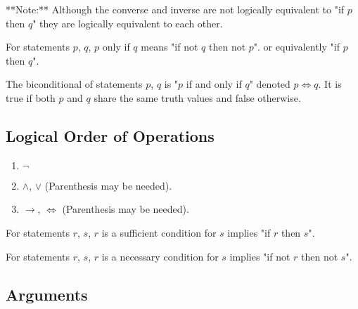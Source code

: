 \documentclass[11pt]{article}
\begin{document}
\starON
**Note:** Although the converse and inverse are not logically equivalent to "if $p$ then $q$"
they are logically equivalent to each other.
\starOFF

\begin{definition}[Only If]\label{def:only-if}
    For statements $p$, $q$,
    $p$ only if $q$ means "if not $q$ then not $p$".
    or equivalently "if $p$ then $q$".
\end{definition}

\begin{definition}[Biconditional]\label{def:biconditional}
    The biconditional of statements $p$, $q$ is
    "$p$ if and only if $q$" denoted $p \iff q$. It
    is true if both $p$ and $q$ share the same truth values
    and false otherwise.
\end{definition}

\subsection{Logical Order of Operations}
\begin{enumerate}
    \item $\neg$
    \item $\land$, $\lor$ (Parenthesis may be needed).
    \item $\to$, $\iff$ (Parenthesis may be needed).
\end{enumerate}

\begin{definition}\label{def:sufficient-condition}
    For statements $r$, $s$,
    $r$ is a sufficient condition for $s$ implies "if $r$ then $s$".
\end{definition}

\begin{definition}\label{def:necessary-condition}
    For statements $r$, $s$,
    $r$ is a necessary condition for $s$ implies "if not $r$ then not $s$".
\end{definition}

\subsection{Arguments}

\end{document}
